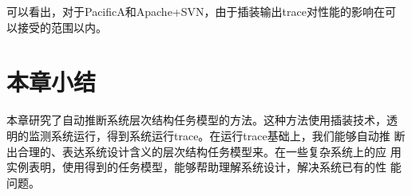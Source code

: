 可以看出，对于PacificA和Apache+SVN，由于插装输出trace对性能的影响在可
以接受的范围以内。

\section{本章小结}
\label{sec:scp:conclusion}

本章研究了自动推断系统层次结构任务模型的方法。这种方法使用插装技术，透
明的监测系统运行，得到系统运行trace。在运行trace基础上，我们能够自动推
断出合理的、表达系统设计含义的层次结构任务模型来。在一些复杂系统上的应
用实例表明，使用得到的任务模型，能够帮助理解系统设计，解决系统已有的性
能问题。


